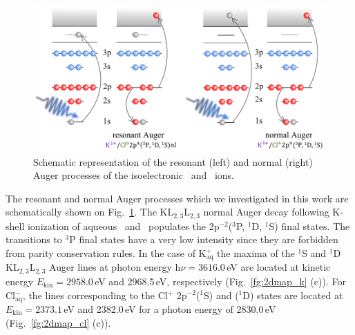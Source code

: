 \begin{figure}
\includegraphics[scale=0.8]{figures/auger_process.pdf}
\caption{Schematic representation of the resonant (left) and normal (right) Auger processes of the isoelectronic \ki~and \cli~ions.}
\label{fg:auger}
\end{figure}

The resonant and normal Auger processes which we investigated in this work are schematically shown on Fig.\ \ref{fg:auger}. The KL$_{2,3}$L$_{2,3}$ normal Auger decay following K-shell ionization of aqueous \ki~and \cli~populates the 2p$^{-2}$($^3$P, $^1$D, $^1$S) final states. The transitions to $^3$P final states have a very low intensity since they are forbidden from parity conservation rules. In the case of K$^{+}_{\text{aq}}$ the maxima of the $^1$S and $^1$D KL$_{2,3}$L$_{2,3}$ Auger lines at photon energy h$\nu = 3616.0$\,eV are located at kinetic energy $E_{\text{kin}} = 2958.0$\,eV and 2968.5\,eV, respectively (Fig.\ \ref{fg:2dmap_k} (c)). For Cl$^{-}_{\text{aq}}$, the lines corresponding to the Cl$^{+}$ 2p$^{-2}$($^1$S) and ($^1$D) states are located at $E_{\text{kin}} = 2373.1$\,eV and 2382.0\,eV for a photon energy of 2830.0\,eV (Fig.\ \ref{fg:2dmap_cl} (c)).


